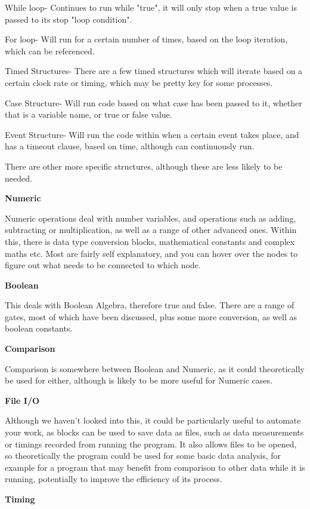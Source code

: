 \documentclass[a4paper,11pt]{report}
\begin{document}
While loop- Continues to run while "true", it will only stop when a true value is passed to its stop "loop condition".

For loop- Will run for a certain number of times, based on the loop iteration, which can be referenced.

Timed Structures- There are a few timed structures which will iterate based on a certain clock rate or timing, which may be pretty key for some processes.

Case Structure- Will run code based on what case has been passed to it, whether that is a variable name, or true or false value.

Event Structure- Will run the code within when a certain event takes place, and has a timeout clause, based on time, although can continuously run.

There are other more specific structures, although these are less likely to be needed.

\textbf{Numeric}

Numeric operations deal with number variables, and operations such as adding, subtracting or multiplication, as well as a range of other advanced ones. Within this, there is data type conversion blocks, mathematical constants and complex maths etc. Most are fairly self explanatory, and you can hover over the nodes to figure out what needs to be connected to which node.

\textbf{Boolean}

This deals with Boolean Algebra, therefore true and false. There are a range of gates, most of which have been discussed, plus some more conversion, as well as boolean constants.

\textbf{Comparison}

Comparison is somewhere between Boolean and Numeric, as it could theoretically be used for either, although is likely to be more useful for Numeric cases.

\textbf{File I/O}

Although we haven't looked into this, it could be particularly useful to automate your work, as blocks can be used to save data as files, such as data measurements or timings recorded from running the program. It also allows files to be opened, so theoretically the program could be used for some basic data analysis, for example for a program that may benefit from comparison to other data while it is running, potentially to improve the efficiency of its process.

\textbf{Timing}
\end{document}
